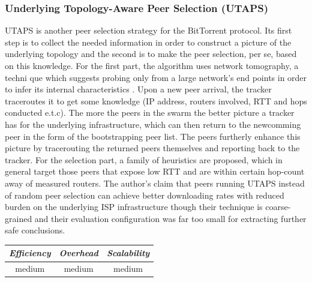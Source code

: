 \subsubsection{Underlying Topology-Aware Peer Selection (UTAPS)}
UTAPS \cite{LCY2008} is another peer selection strategy for the BitTorrent
protocol. Its first step is to collect the needed information in order to
construct a picture of the underlying topology and the second is to make the
peer selection, per se, based on this knowledge. For the first part, the
algorithm uses network tomography, a techni  que which suggests probing only
from a large network's end points in order to infer its internal characteristics
\cite{chny_tomography_2002}. Upon a new peer arrival, the tracker traceroutes it
to get some knowledge (IP address, routers involved, RTT and hops conducted
e.t.c). The more the peers in the swarm the better picture a tracker has for the
underlying infrastructure, which can then return to the newcomming peer in the
form of the bootstrapping peer list. The peers furtherly enhance this picture by
tracerouting the returned peers themselves and reporting back to the tracker.
For the selection part, a family of heuristics are proposed, which in general
target those peers that expose low RTT and are within certain hop-count away of
measured routers. The author's claim that peers running UTAPS instead of random
peer selection can achieve better downloading rates with reduced burden on the
underlying ISP infrastructure though their technique is coarse-grained and their
evaluation configuration was far too small for extracting further safe
conclusions.

\begin{center}
\begin{tabular}{ccc}
\emph{Efficiency} & \emph{Overhead} & \emph{Scalability} \\
\hline
medium &
medium &
%
medium
\end{tabular}
\end{center}

